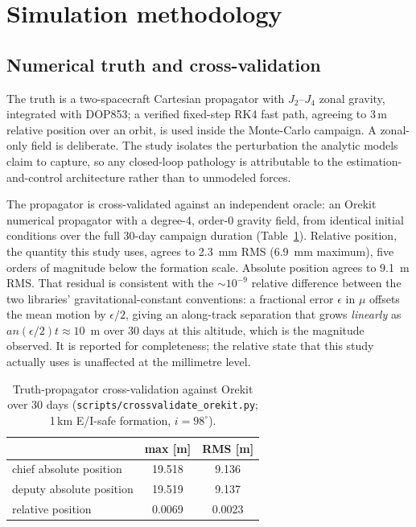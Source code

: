 \section{Simulation methodology}\label{sec:method}

\subsection{Numerical truth and cross-validation}

The truth is a two-spacecraft Cartesian propagator with $J_2$--$J_4$ zonal
gravity, integrated with DOP853; a verified fixed-step RK4 fast path,
agreeing to 3\,\textmu m relative position over an orbit, is used inside
the Monte-Carlo campaign. A zonal-only field is deliberate. The study
isolates the perturbation the analytic models claim to capture, so any
closed-loop pathology is attributable to the estimation-and-control
architecture rather than to unmodeled forces.

The propagator is cross-validated against an independent oracle: an Orekit
numerical propagator with a degree-4, order-0 gravity field, from identical
initial conditions over the full 30-day campaign duration
(Table~\ref{tab:orekit}). Relative position, the quantity this study uses,
agrees to 2.3~mm RMS (6.9~mm maximum), five orders of magnitude below the
formation scale. Absolute position agrees to 9.1~m RMS. That residual is
consistent with the $\sim$$10^{-9}$ relative difference between the two
libraries' gravitational-constant conventions: a fractional error
$\epsilon$ in $\mu$ offsets the mean motion by $\epsilon/2$, giving an
along-track separation that grows \emph{linearly} as
$a n (\epsilon/2) t \approx 10$~m over 30 days at this altitude, which is
the magnitude observed. It is reported for completeness; the relative state
that this study actually uses is unaffected at the millimetre level.

\begin{table}[t]
  \centering
  \caption{Truth-propagator cross-validation against Orekit over 30 days
  (\texttt{scripts/crossvalidate\_orekit.py}; 1\,km E/I-safe formation,
  $i = 98^\circ$).}
  \label{tab:orekit}
  \begin{tabular}{lcc}
    \toprule
    & max [m] & RMS [m] \\
    \midrule
    chief absolute position & 19.518 & 9.136 \\
    deputy absolute position & 19.519 & 9.137 \\
    relative position & 0.0069 & 0.0023 \\
    \bottomrule
  \end{tabular}
\end{table}


